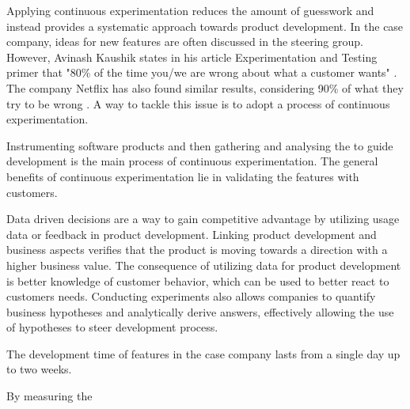 \documentclass[english]{tktltiki2}
\theoremstyle{definition}
\theoremstyle{remark}
\begin{document}
Applying continuous experimentation reduces the amount of guesswork and instead provides a systematic approach towards product development. In the case company, ideas for new features are often discussed in the steering group. However, Avinash Kaushik states in his article Experimentation and Testing primer that "80\% of the time you/we are wrong about what a customer wants" \cite{kaushik}. The company Netflix has also found similar results, considering 90\% of what they try to be wrong \cite{moran2007wrong}. A way to tackle this issue is to adopt a process of continuous experimentation.

Instrumenting software products and then gathering and analysing the to guide development is the main process of continuous experimentation. The general benefits of continuous experimentation lie in validating the features with customers. 


Data driven decisions are a way to gain competitive advantage by utilizing usage data or feedback in product development. Linking product development and business aspects verifies that the product is moving towards a direction with a higher business value. The consequence of utilizing data for product development is better knowledge of customer behavior, which can be used to better react to customers needs. Conducting experiments also allows companies to quantify business hypotheses and analytically derive answers, effectively allowing the use of hypotheses to steer development process.

The development time of features in the case company lasts from a single day up to two weeks. 

By measuring the 
\end{document}

